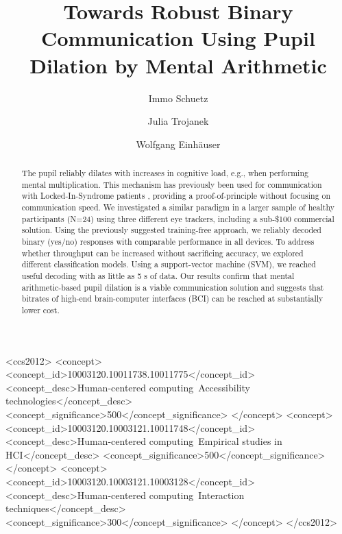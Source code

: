 \documentclass[manuscript]{acmart}
\begin{document}
\title{Towards Robust Binary Communication Using Pupil Dilation by Mental Arithmetic}

\author{Immo Schuetz}
 
\author{Julia Trojanek}

\author{Wolfgang Einhäuser}

\renewcommand{\shortauthors}{Schuetz, Trojanek \& Einhäuser}

\begin{abstract}
 The pupil reliably dilates with increases in cognitive load, e.g., when performing mental multiplication. This mechanism has previously been used for communication with Locked-In-Syndrome patients \cite{Stoll2013}, providing a proof-of-principle without focusing on communication speed. We investigated a similar paradigm in a larger sample of healthy participants (N=24) using three different eye trackers, including a sub-\$100 commercial solution. Using the previously suggested training-free approach, we reliably decoded binary (yes/no) responses with comparable performance in all devices. To address whether throughput can be increased without sacrificing accuracy, we explored different classification models. Using a support-vector machine (SVM), we reached useful decoding with as little as 5 s of data. Our results confirm that mental arithmetic-based pupil dilation is a viable communication solution and suggests that bitrates of high-end brain-computer interfaces (BCI) can be reached at substantially lower cost.
\end{abstract}

\begin{CCSXML}
<ccs2012>
   <concept>
       <concept_id>10003120.10011738.10011775</concept_id>
       <concept_desc>Human-centered computing~Accessibility technologies</concept_desc>
       <concept_significance>500</concept_significance>
       </concept>
   <concept>
       <concept_id>10003120.10003121.10011748</concept_id>
       <concept_desc>Human-centered computing~Empirical studies in HCI</concept_desc>
       <concept_significance>500</concept_significance>
       </concept>
   <concept>
       <concept_id>10003120.10003121.10003128</concept_id>
       <concept_desc>Human-centered computing~Interaction techniques</concept_desc>
       <concept_significance>300</concept_significance>
       </concept>
 </ccs2012>
\end{CCSXML}
\end{document}
